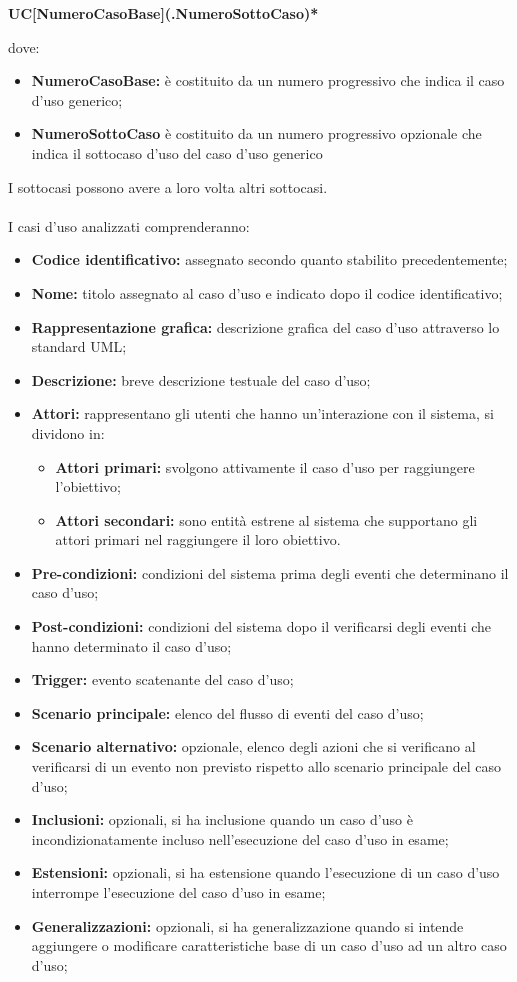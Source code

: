 \begin{center}
	\textbf{UC[NumeroCasoBase](.NumeroSottoCaso)*}
\end{center}
dove:
\begin{itemize}
	\item \textbf{NumeroCasoBase:} è costituito da un numero progressivo che indica il caso d'uso generico;
	\item \textbf{NumeroSottoCaso} è costituito da un numero progressivo opzionale che indica il sottocaso d'uso del caso d'uso generico
\end{itemize}  
I sottocasi possono avere a loro volta altri sottocasi.	\\ \\
I casi d'uso analizzati comprenderanno:
\begin{itemize}
	\item \textbf{Codice identificativo: }assegnato secondo quanto stabilito precedentemente;
	\item \textbf{Nome: }titolo assegnato al caso d'uso e indicato dopo il codice identificativo; 
	\item \textbf{Rappresentazione grafica: }descrizione grafica del caso d'uso attraverso lo standard UML;
	\item \textbf{Descrizione: }breve descrizione testuale del caso d'uso;
	\item \textbf{Attori: }rappresentano gli utenti che hanno un'interazione con il sistema, si dividono in:
	\begin{itemize}
		\item \textbf{Attori primari: }svolgono attivamente il caso d'uso per raggiungere l'obiettivo;
		\item \textbf{Attori secondari: }sono entità estrene al sistema che supportano gli attori primari nel raggiungere il loro obiettivo.
	\end{itemize}
	\item \textbf{Pre-condizioni: }condizioni del sistema prima degli eventi che determinano il caso d'uso;
	\item \textbf{Post-condizioni: }condizioni del sistema dopo il verificarsi degli eventi che hanno determinato il caso d'uso;
	\item \textbf{Trigger: }evento scatenante del caso d'uso;
	\item \textbf{Scenario principale: }elenco del flusso di eventi del caso d'uso;
	\item \textbf{Scenario alternativo: }opzionale, elenco degli azioni che si verificano al verificarsi di un evento non previsto rispetto allo scenario principale del caso d'uso;
	\item \textbf{Inclusioni: }opzionali, si ha inclusione quando un caso d'uso è incondizionatamente incluso nell'esecuzione del caso d'uso in esame;	
	\item \textbf{Estensioni: }opzionali, si ha estensione quando l'esecuzione di un caso d'uso interrompe l'esecuzione del caso d'uso in esame;
	\item \textbf{Generalizzazioni: }opzionali, si ha generalizzazione quando si intende aggiungere o modificare caratteristiche base di un caso d'uso ad un altro caso d'uso;
\end{itemize}

